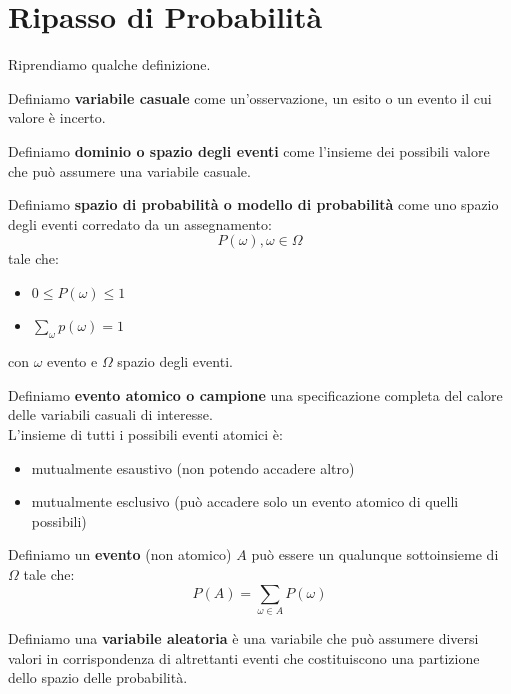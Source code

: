\documentclass[a4paper,12pt, oneside]{book}
\begin{document}
\chapter{Ripasso di Probabilità}
Riprendiamo qualche definizione.
\begin{definizione}
  Definiamo \textbf{variabile casuale} come un'osservazione, un esito o un
  evento il cui valore è incerto.
\end{definizione}
\begin{definizione}
  Definiamo \textbf{dominio o spazio degli eventi} come l'insieme dei possibili
  valore che può assumere una variabile casuale.
\end{definizione}
\begin{definizione}
  Definiamo \textbf{spazio di probabilità o modello di probabilità} come uno
  spazio degli eventi corredato da un assegnamento:
  \[P(\omega),\omega\in \Omega\]
  tale che:
  \begin{itemize}
    \item $0\leq P(\omega)\leq 1$
    \item $\sum_\omega p(\omega)=1$
  \end{itemize}
  con $\omega$ evento e $\Omega$ spazio degli eventi.
\end{definizione}
\begin{definizione}
  Definiamo \textbf{evento atomico o campione} una specificazione completa del
  calore delle variabili casuali di interesse.\\
  L'insieme di tutti i possibili eventi atomici è:
  \begin{itemize}
    \item mutualmente esaustivo (non potendo accadere altro)
    \item mutualmente esclusivo (può accadere solo un evento atomico di quelli
    possibili) 
  \end{itemize}
\end{definizione}
\begin{definizione}
  Definiamo un \textbf{evento} (non atomico) $A$ può essere un qualunque
  sottoinsieme di $\Omega$ tale che: 
  \[P(A)=\sum_{\omega\in A}P(\omega)\]
\end{definizione}
\begin{definizione}
  Definiamo una \textbf{variabile aleatoria} è una variabile che può assumere
  diversi valori in corrispondenza di altrettanti eventi che costituiscono una
  partizione dello spazio delle probabilità.
\end{definizione}
\end{document}
